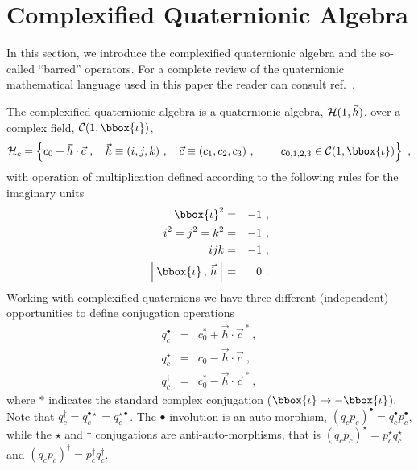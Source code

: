 

\section{Complexified Quaternionic Algebra}
\label{s2}

In this section, we introduce the complexified quaternionic algebra and the 
so-called ``barred'' operators. For a complete review of the quaternionic 
mathematical language used in this paper the reader can consult 
ref.~\cite{DR}. 

The complexified quaternionic
algebra is a quaternionic algebra, ${\cal H}(1,\vec{h})$, over a complex 
field, ${\cal C}(1,\bbox{\iota})$,
\begin{equation}
{\cal H}_c = \left\{ c_0 + \vec{h} \cdot \vec{c}~,~~~\vec{h}\equiv(i,j,k)~,
                   ~~~\vec{c}\equiv(c_1,c_2,c_3)~,
                   ~~~~~~~c_{0,1,2,3} \in {\cal C}(1,\bbox{\iota})
           \right\}~,
\end{equation}
with operation of multiplication defined according to the following rules 
for the imaginary units
\begin{eqnarray*}
\bbox{\iota}^2                          & = & -1~,\\ 
i^2=j^2=k^2                             & = & -1~,\\
ijk                                     & = & -1~,\\
\left[ \, \bbox{\iota} \, , \, \vec{h} \, \right]  & = &  0~.
\end{eqnarray*}
Working with complexified quaternions we have three different (independent)
opportunities to define conjugation operations
\begin{eqnarray*}
q_c^{\bullet} & = & c_0^* + \vec{h} \cdot \vec{c}^{\, *}~,\\
q_c^{\star} & = & c_0 - \vec{h} \cdot \vec{c} ~,\\
q_c^{\dag} & = & c_0^* - \vec{h} \cdot \vec{c}^{\, *}~,
\end{eqnarray*}
where $*$ indicates the standard complex conjugation 
($\bbox{\iota} \rightarrow - \bbox{\iota}$). Note that 
$q_c^{\dag}=q_c^{\bullet \star}= q_c^{\star \bullet}$. The $\bullet$ involution
is an auto-morphism, $(q_c p_c)^{\bullet}=q_c^{\bullet} p_c^{\bullet}$, while
the $\star$ and $\dag$ conjugations are anti-auto-morphisms, that is 
$(q_c p_c)^{\star} = p_c^{\star} q_c^{\star}$ and
$(q_c p_c)^{\dag} = p_c^{\dag} q_c^{\dag}$.

